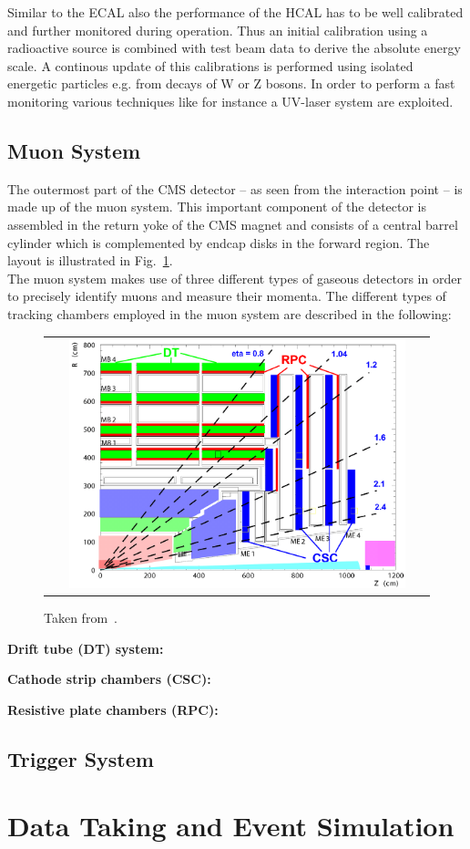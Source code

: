 Similar to the ECAL also the performance of the HCAL has to be well calibrated and further monitored during operation. Thus an initial calibration using a radioactive source is combined with test beam data to derive the absolute energy scale. A continous update of this calibrations is performed using isolated energetic particles e.g. from decays of W or Z bosons. In order to perform a fast monitoring various techniques like for instance a UV-laser system are exploited.

\subsection{Muon System}
\label{subsec:cms_muon}
The outermost part of the CMS detector -- as seen from the interaction point -- is made up of the muon system. This important component of the detector is assembled in the return yoke of the CMS magnet and consists of a central barrel cylinder which is complemented by endcap disks in the forward region. The layout is illustrated in Fig.~\ref{fig:CMS_muon}.\\
The muon system makes use of three different types of gaseous detectors in order to precisely identify muons and measure their momenta. The different types of tracking chambers employed in the muon system are described in the following:
\begin{figure}[!tp]
  \centering
  \begin{tabular}{c}
    \includegraphics[width=0.9\textwidth]{figures/Figures_Experimental_Apparatus_MuonDetector.png}
  \end{tabular}
  \caption{Taken from~\cite{bib:cmsptdr1}.}
  \label{fig:CMS_muon}
\end{figure}

\begin{description}
 \item \textbf{Drift tube (DT) system:}
 \item \textbf{Cathode strip chambers (CSC):}
 \item \textbf{Resistive plate chambers (RPC):}
\end{description}

\subsection{Trigger System}
\label{subsec:cms_trigger}

\section{Data Taking and Event Simulation}
\label{sec:data}
